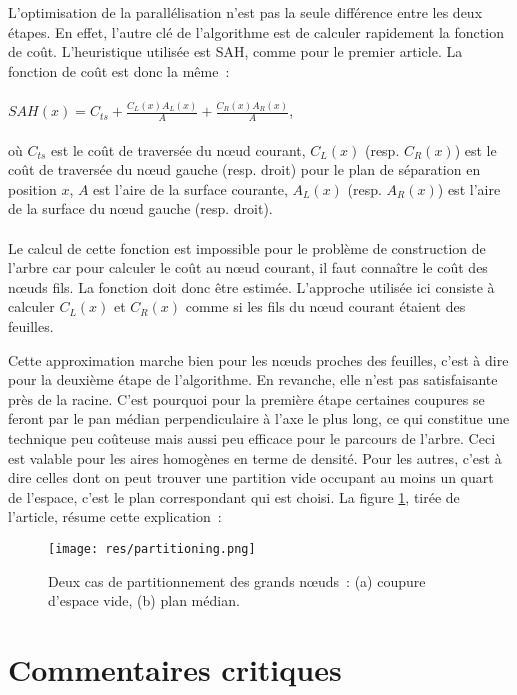 \documentclass[a4paper]{article}
\begin{document}
L'optimisation de la parallélisation n'est pas la seule différence entre les deux étapes. En effet, l'autre clé de l'algorithme est de calculer rapidement la fonction de coût. L'heuristique utilisée est SAH, comme pour le premier article. La fonction de coût est donc la même~:
\\\\
$SAH(x) = C_{ts} + \frac{C_L(x)A_L(x)}{A} + \frac{C_R(x)A_R(x)}{A}$,
\\\\
où $C_{ts}$ est le coût de traversée du nœud courant, $C_L(x)$ (resp. $C_R(x)$) est le coût de traversée du nœud gauche (resp. droit) pour le plan de séparation en position $x$, $A$ est l'aire de la surface courante, $A_L(x)$ (resp. $A_R(x)$) est l'aire de la surface du nœud gauche (resp. droit).
\\\\
Le calcul de cette fonction est impossible pour le problème de construction de l'arbre car pour calculer le coût au nœud courant, il faut connaître le coût des nœuds fils. La fonction doit donc être estimée. L'approche utilisée ici consiste à calculer $C_L(x)$ et $C_R(x)$ comme si les fils du nœud courant étaient des feuilles.

Cette approximation marche bien pour les nœuds proches des feuilles, c'est à dire pour la deuxième étape de l'algorithme. En revanche, elle n'est pas satisfaisante près de la racine. C'est pourquoi pour la première étape certaines coupures se feront par le pan médian perpendiculaire à l'axe le plus long, ce qui constitue une technique peu coûteuse mais aussi peu efficace pour le parcours de l'arbre. Ceci est valable pour les aires homogènes en terme de densité. Pour les autres, c'est à dire celles dont on peut trouver une partition vide occupant au moins un quart de l'espace, c'est le plan correspondant qui est choisi. La figure \ref{fig:partition}, tirée de l'article, résume cette explication~:

\begin{figure}[!h]
\centering
\texttt{[image: res/partitioning.png]}
\caption{\label{fig:partition}Deux cas de partitionnement des grands nœuds~: (a) coupure d'espace vide, (b) plan médian.}
\end{figure}


\section{Commentaires critiques}
\end{document}
